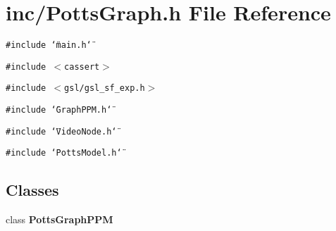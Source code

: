 \section{inc/PottsGraph.h File Reference}
\label{PottsGraph_8h}
{\tt \#include \char`\"{}main.h\char`\"{}}\par
{\tt \#include $<$cassert$>$}\par
{\tt \#include $<$gsl/gsl\_\-sf\_\-exp.h$>$}\par
{\tt \#include \char`\"{}GraphPPM.h\char`\"{}}\par
{\tt \#include \char`\"{}VideoNode.h\char`\"{}}\par
{\tt \#include \char`\"{}PottsModel.h\char`\"{}}\par
\subsection*{Classes}
\begin{CompactItemize}
\item 
class {\bf PottsGraphPPM}
\end{CompactItemize}
